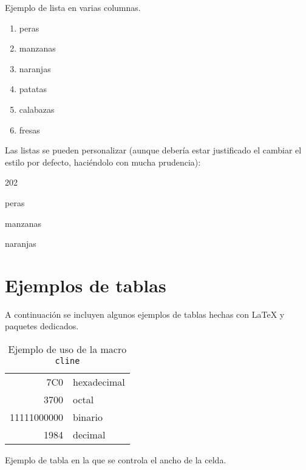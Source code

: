 \noindent Ejemplo de lista en varias columnas.
\begin{multicols}{2} %
	\begin{enumerate}
		\item peras
		\item manzanas
		\item naranjas
		\item patatas
		\item calabazas
		\item fresas
	\end{enumerate}
\end{multicols}

\noindent Las listas se pueden personalizar (aunque debería estar justificado el cambiar el estilo por defecto, haciéndolo con mucha prudencia):

\begin{dingautolist}{202} %
	\item peras
	\item manzanas
	\item naranjas
\end{dingautolist}


\section{Ejemplos de tablas}
\label{sec:ejTablas}
A continuación se incluyen algunos ejemplos de tablas hechas con 
\LaTeX{} y paquetes dedicados.

\begin{table}[htb]%
	\centering
	\caption{Ejemplo de uso de la macro \texttt{cline}}
	\label{tab:cline}
	\begin{tabular}[t]{|r|l|}
		\hline
		7C0 & hexadecimal \\[1cm] %
		3700 & octal \\ \cline{2-2}
		11111000000 & binario \\
		\hline \hline
		1984 & decimal \\
		\hline
	\end{tabular}
\end{table}


\noindent Ejemplo de tabla en la que se 
controla el ancho de la celda.


